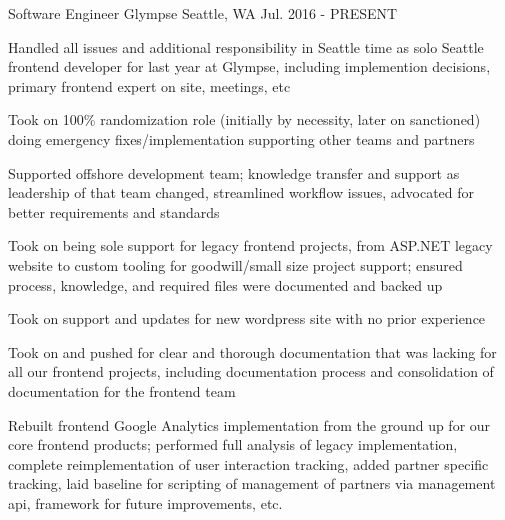 

\begin{cventries}

  \cventry
    {Software Engineer} %
    {Glympse} %
    {Seattle, WA} %
    {Jul. 2016 - PRESENT} %
    {
      \begin{cvitems} %
        \item {Handled all issues and additional responsibility in Seattle time as solo Seattle frontend developer for last year at Glympse, including implemention decisions, primary frontend expert on site, meetings, etc}
        \item {Took on 100\% randomization role (initially by necessity, later on sanctioned) doing emergency fixes/implementation supporting other teams and partners}
        \item {Supported offshore development team; knowledge transfer and support as leadership of that team changed, streamlined workflow issues, advocated for better requirements and standards}
        \item {Took on being sole support for legacy frontend projects, from ASP.NET legacy website to custom tooling for goodwill/small size project support; ensured process, knowledge, and required files were documented and backed up}
        \item {Took on support and updates for new wordpress site with no prior experience}
        \item {Took on and pushed for clear and thorough documentation that was lacking for all our frontend projects, including documentation process and consolidation of documentation for the frontend team}
        \item {Rebuilt frontend Google Analytics implementation from the ground up for our core frontend products; performed full analysis of legacy implementation, complete reimplementation of user interaction tracking, added partner specific tracking, laid baseline for scripting of management of partners via management api, framework for future improvements, etc.}

\end{cvitems}}
\end{cventries}
